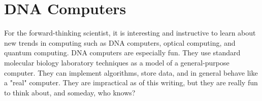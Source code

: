 \section{DNA Computers}
For the forward-thinking scientist, it is interesting and instructive to learn about new trends in computing such as DNA computers, optical computing, and quantum computing. DNA computers are especially fun. They use standard molecular biology laboratory techniques as a model of a general-purpose computer. They can implement algorithms, store data, and in general behave like a "real" computer. They are impractical as of this writing, but they are really fun to think about, and someday, who knows? 

